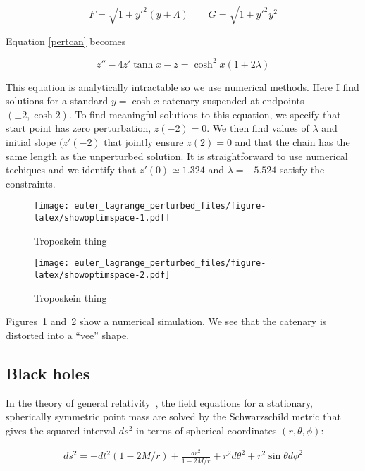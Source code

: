 \documentclass[pdflatex,sn-mathphys-num]{sn-jnl}%
\theoremstyle{thmstyleone}%
\theoremstyle{thmstyletwo}%
\theoremstyle{thmstylethree}%
\begin{document}
\begin{equation}
  F = \sqrt{1+y'^2}(y+\Lambda)\qquad
  G = \sqrt{1+y'^2}y^2
\end{equation}

Equation \ref{pertcan} becomes

\begin{equation}
  z'' - 4z'\tanh x - z = \cosh^2 x(1+2\lambda)
\end{equation}

This equation is analytically intractable so we use numerical methods.
Here I find solutions for a standard $y=\cosh x$ catenary suspended at
endpoints $(\pm 2, \cosh 2)$.  To find meaningful solutions to this
equation, we specify that start point has zero perturbation,
$z(-2)=0$.  We then find values of $\lambda$ and initial slope
$(z'(-2)$ that jointly ensure $z(2)=0$ and that the chain has the same
length as the unperturbed solution.  It is straightforward to use
numerical techiques and we identify that $z'(0)\simeq 1.324$ and
$\lambda = -5.524$ satisfy the constraints.


\begin{figure}[h]
\centering
\texttt{[image: euler\_lagrange\_perturbed\_files/figure-latex/showoptimspace-1.pdf]}
\caption{Troposkein thing}\label{space}
\end{figure}

\begin{figure}[h]
\centering
\texttt{[image: euler\_lagrange\_perturbed\_files/figure-latex/showoptimspace-2.pdf]}
\caption{Troposkein thing}\label{space2}
\end{figure}

Figures~\ref{space} and~\ref{space2} show a numerical simulation.  We
see that the catenary is distorted into a ``vee'' shape.


\subsection{Black holes}

In the theory of general relativity~\cite{misner1973}, the field
equations for a stationary, spherically symmetric point mass are
solved by the Schwarzschild metric that gives the squared interval
$ds^2$ in terms of spherical coordinates $(r,\theta,\phi)$:

\begin{eqnarray}\label{schwarzschild}
  ds^2=
  -dt^2(1-2M/r) + \frac{dr^2}{1-2M/r} + r^2d\theta^2 + r^2\sin\theta d\phi^2
  \end{eqnarray}
\end{document}
